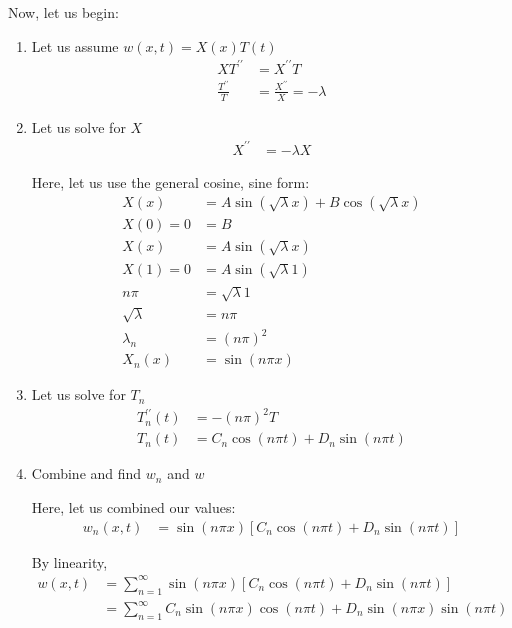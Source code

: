\documentclass{article}
\begin{document}
\begin{enumerate}
  Now, let us begin:
  \begin{enumerate}
    \item Let us assume $w(x, t) = X(x)T(t)$
    \begin{align}
      XT^{\prime\prime} & = X^{\prime\prime}T\\
      \frac{T^{\prime\prime}}{T} & = \frac{X^{\prime\prime}}{X} = - \lambda
    \end{align}

    \item Let us solve for $X$
    \begin{align}
      X^{\prime\prime} & = - \lambda X
    \end{align}

    Here, let us use the general cosine, sine form:
    \begin{align}
      X(x) & = A \sin \left(\sqrt \lambda x \right) + B \cos \left(\sqrt \lambda x \right)\\
      X(0) = 0 & = B\\
      X(x) & = A \sin \left( \sqrt \lambda x \right)\\
      X(1) = 0 & = A \sin \left( \sqrt \lambda 1 \right)\\
      n \pi & = \sqrt \lambda 1\\
      \sqrt \lambda & = n \pi\\
      \lambda_n & = (n \pi)^2\\
      X_n(x) & = \sin(n \pi x)
    \end{align}

    \item Let us solve for $T_n$
    \begin{align}
      T^{\prime\prime}_n(t) & = - (n \pi)^2T\\
      T_n(t) & = C_n \cos(n \pi t) + D_n \sin(n \pi t)
    \end{align}

    \item Combine and find $w_n$ and $w$

    Here, let us combined our values:
    \begin{align}
      w_n(x, t) & = \sin(n \pi x)\left[ C_n \cos(n \pi t) + D_n \sin(n \pi t) \right]
    \end{align}

    By linearity,
    \begin{align}
      w(x, t) & = \sum^\infty_{n = 1}
      \sin(n \pi x)\left[ C_n \cos(n \pi t) + D_n \sin(n \pi t) \right]\\
      & = \sum^\infty_{n = 1}
      C_n \sin(n \pi x) \cos(n \pi t) + D_n \sin(n \pi x) \sin(n \pi t)
    \end{align}


\end{enumerate}
\end{enumerate}
\end{document}

